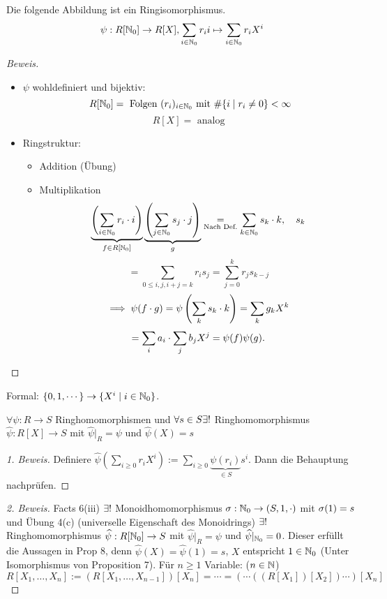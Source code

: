 \documentclass[a4paper]{report}
\begin{document}
\begin{prop}
  Die folgende Abbildung ist ein Ringisomorphismus.
  \[\psi : R[\mathbb{N}_0] \to R[X], \sum_{i \in \mathbb{N}_0} r_{i}i \mapsto \sum_{i \in \mathbb{N}_0}r_{i}X^{i}\]
  \begin{proof}[Beweis]\item
    \begin{itemize}
      \item $\psi$ wohldefiniert und bijektiv:
            \[R[\mathbb{N}_0] = \text{ Folgen } (r_{i})_{i \in \mathbb{N}_0} \text{ mit } \#\{i \mid r_{i} \ne 0\} < \infty\]
            \[R[X] = \text{ analog }\]
      \item Ringstruktur:
            \begin{itemize}
              \item Addition (Übung)
              \item Multiplikation
                    \[\underbrace{\left(\sum_{i \in \mathbb{N}_0} r_{i}\cdot i\right)}_{f \in R[\mathbb{N}_0]}\underbrace{\left(\sum_{j \in \mathbb{N}_0} s_{j}\cdot j\right)}_{g} \underset{\text{Nach Def.}}= \sum_{k \in \mathbb{N}_0} s_{k}\cdot k, \quad s_{k}\]
                    \[= \sum_{0 \le i,j, i+j = k}r_{i}s_{j} = \sum_{j=0}^{k}r_{j}s_{k-j}\]
                    \[\implies \psi(f \cdot g) = \psi\left(\sum_{k} s_{k}\cdot k\right) = \sum_{k}g_kX^{k}\]
                    \[ = \sum_{i}a_{i}\cdot  \sum_{j}b_{j}X^{j} = \psi(f)\psi(g).\qedhere\]
            \end{itemize}
    \end{itemize}
  \end{proof}
  Formal: $\{0, 1, \cdots\} \to \{X^{i} \mid i \in \mathbb{N}_0\}$.
\end{prop}

\begin{prop} $\forall \psi : R \to S$ Ringhomomorphismen und $\forall s \in S \exists !$ Ringhomomorphismus $\hat \psi : R[X] \to S$ mit $\hat \psi|_{R} = \psi$ und $\hat \psi(X) = s$
\begin{proof}[1. Beweis]
  Definiere $\hat\psi(\sum_{i \ge 0}r_{i}X^{i}) := \sum_{i \ge 0}\underbrace{\psi(r_{i})}_{\in S}s^{i}$. Dann die Behauptung nachprüfen.
\end{proof}
\begin{proof}[2. Beweis]
  Facts 6(iii) $\exists !$ Monoidhomomorphismus $\sigma : \mathbb{N}_0 \to (S, 1, \cdot)$ mit $\sigma(1) = s$ und Übung 4(c) (universelle Eigenschaft des Monoidrings) $\exists !$ Ringhomomorphismus $\widehat \psi : R[\mathbb{N}_0] \to S$ mit $\hat \psi|_{R} = \psi$ und $\widehat\psi|_{\mathbb{N}_0} = 0$. Dieser erfüllt die Aussagen in Prop 8, denn $\hat \psi(X) = \hat \psi(1) = s$, $X$ entspricht $1 \in \mathbb{N}_0 $ (Unter Isomorphismus von Proposition 7).
  Für $n \ge 1$ Variable: ($n \in \mathbb{N}$)
  \[R[X_{1}, \ldots, X_{n}] := (R[X_{1}, \ldots, X_{n-1}])[X_{n}] = \cdots = (\cdots((R[X_{1}])[X_{2}]) \cdots)[X_{n}]\]
\end{proof}
\end{prop}
\end{document}

